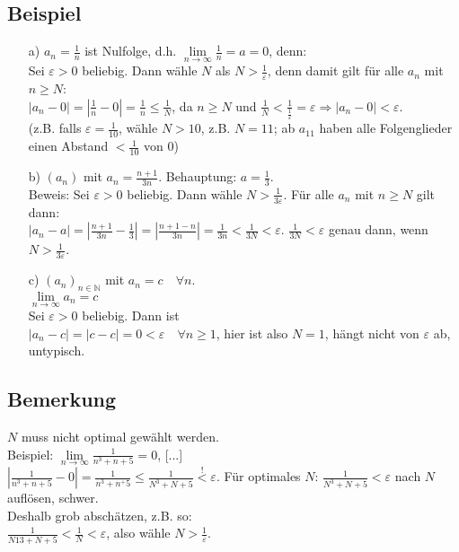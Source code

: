 \documentclass[12pt, titlepage]{article}
\newcommand{\N}{\mathds{N}}
\newcommand{\infn}{n\rightarrow\infty}
\renewcommand{\>}{\rightarrow}
\renewcommand{\*}{\cdot}
\renewcommand{\epsilon}{\varepsilon}
\begin{document}
	\subsection{Beispiel}
	\begin{itemize}
		\item[a)] $a_n=\frac{1}{n}$ ist Nulfolge, d.h. $\lim\limits_{\infn}\frac{1}{n}=a=0$, denn:\\
		Sei $\epsilon>0$ beliebig. Dann wähle $N$ als $N>\frac{1}{\epsilon}$, denn damit gilt für alle $a_n$ mit $n\geq N$:\\
		$|a_n-0|=|\frac{1}{n}-0|=\frac{1}{n}\leq\frac{1}{N}$, da $n\geq N$ und $\frac{1}{N}<\frac{1}{\frac{1}{\epsilon}}=\epsilon\Rightarrow|a_n-0|<\epsilon$.\\
		(z.B. falls $\epsilon=\frac{1}{10}$, wähle $N>10$, z.B. $N=11$; ab $a_{11}$ haben alle Folgenglieder einen Abstand $<\frac{1}{10}$ von 0)
		\item[b)] $(a_n)$ mit $a_n=\frac{n+1}{3n}$. Behauptung: $a=\frac{1}{3}$.\\
		Beweis: Sei $\epsilon>0$ beliebig. Dann wähle $N>\frac{1}{3\epsilon}$. Für alle $a_n$ mit $n\geq N$ gilt dann:\\
		$|a_n-a|=|\frac{n+1}{3n}-\frac{1}{3}|=|\frac{n+1-n}{3n}|=\frac{1}{3n}<\frac{1}{3N}<\epsilon$. $\frac{1}{3N}<\epsilon$ genau dann, wenn $N>\frac{1}{3\epsilon}$.
		\item[c)] $(a_n)_{n\in\N}$ mit $a_n=c\quad\forall n$.\\
		$\lim\limits_{\infn}a_n=c$\\
		Sei $\epsilon>0$ beliebig. Dann ist\\
		$|a_n-c|=|c-c|=0<\epsilon\quad\forall n\geq1$, hier ist also $N=1$, hängt nicht von $\epsilon$ ab, untypisch.
	\end{itemize}
	\subsection{Bemerkung}
	$N$ muss nicht optimal gewählt werden.\\
	Beispiel: $\lim\limits_{\infn}\frac{1}{n^3+n+5}=0$, [...]\\
	$|\frac{1}{n^3+n+5}-0|=\frac{1}{n^3+n^+5}\leq\frac{1}{N^3+N+5}\overset{!}{<}\epsilon$. Für optimales $N$: $\frac{1}{N^3+N+5}<\epsilon$ nach $N$ auflösen, schwer.\\
	Deshalb grob abschätzen, z.B. so:\\
	$\frac{1}{N13+N+5}<\frac{1}{N}<\epsilon$, also wähle $N>\frac{1}{\epsilon}$.
\end{document}
